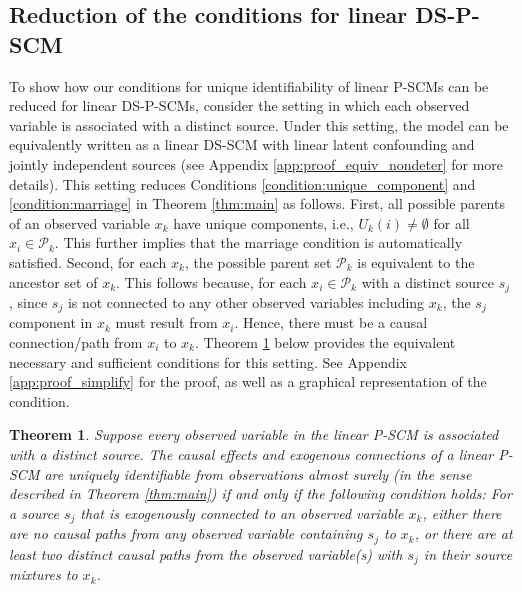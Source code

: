 \documentclass[12pt]{article}
\newtheorem{theorem}{Theorem}
\begin{document}
\subsection{Reduction of the conditions for linear DS-P-SCM} \label{sec:simplify}
\vspace{-2mm}
To show how our conditions for unique identifiability of linear P-SCMs can be reduced for linear DS-P-SCMs, consider the setting in which each observed variable is associated with a distinct source. Under this setting, the model can be equivalently written as a linear DS-SCM with linear latent confounding and jointly independent sources (see Appendix \ref{app:proof_equiv_nondeter} for more details).
This setting reduces Conditions \ref{condition:unique_component} and \ref{condition:marriage} in Theorem \ref{thm:main} as follows. First, all possible parents of an observed variable $x_k$ have unique components, i.e., $U_k(i)\neq \emptyset$ for all $x_i\in\mathcal{P}_k$. This further implies that the marriage condition is automatically satisfied. Second, for each $x_k$, the possible parent set $\mathcal{P}_k$ is equivalent to the ancestor set of $x_k$. This follows because, for each $x_i\in \mathcal{P}_k$ with a distinct source $s_j$, since $s_j$ is not connected to any other observed variables including $x_k$, the $s_j$ component in $x_k$ must result from $x_i$. Hence, there must be a causal connection/path from $x_i$ to $x_k$. 
Theorem \ref{thm:simplify} below provides the equivalent necessary and sufficient conditions for this setting. See Appendix \ref{app:proof_simplify} for the proof, as well as a graphical representation of the condition. 
\vspace{-1mm}
\begin{theorem} \label{thm:simplify}
Suppose every observed variable in the linear P-SCM is associated with a distinct source. The causal effects and exogenous connections of a linear P-SCM are uniquely identifiable from observations almost surely (in the sense described in Theorem \ref{thm:main}) if and only if the following condition holds: For a source $s_j$ that is exogenously connected to an observed variable $x_k$, either there are no causal paths from any observed variable containing $s_j$ to $x_k$, or there are at least two distinct causal paths from the observed variable(s) with $s_j$ in their source mixtures to $x_k$.
\end{theorem}
\vspace{-2mm}
\end{document}
